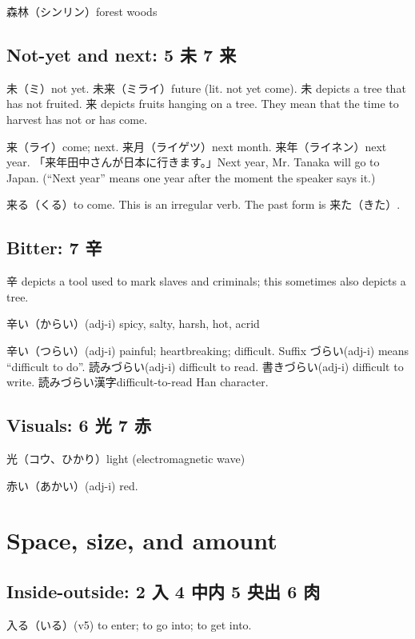 森林（シンリン）forest woods

\subsection{Not-yet and next: 5 未 7 来}

未（ミ）not yet.
未来（ミライ）future (lit. not yet come).
未 depicts a tree that has not fruited.
来 depicts fruits hanging on a tree.
They mean that the time to harvest has not or has come.

来（ライ）come; next.
来月（ライゲツ）next month.
来年（ライネン）next year.
「来年田中さんが日本に行きます。」Next year, Mr. Tanaka will go to Japan.
(``Next year'' means one year after the moment the speaker says it.)

来る（くる）to come.
This is an irregular verb.
The past form is 来た（きた）.

\subsection{Bitter: 7 辛}

辛 depicts a tool used to mark slaves and criminals;
this sometimes also depicts a tree.

辛い（からい）(adj-i) spicy, salty, harsh, hot, acrid

辛い（つらい）(adj-i) painful; heartbreaking; difficult.
Suffix づらい(adj-i) means ``difficult to do''.
読みづらい(adj-i) difficult to read.
書きづらい(adj-i) difficult to write.
読みづらい漢字difficult-to-read Han character.

\subsection{Visuals: 6 光 7 赤}

光（コウ、ひかり）light (electromagnetic wave)

赤い（あかい）(adj-i) red.

\section{Space, size, and amount}

\subsection{Inside-outside: 2 入 4 中内 5 央出 6 肉}

入る（いる）(v5)
to enter; to go into; to get into.

